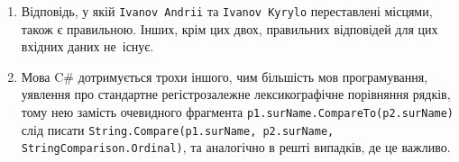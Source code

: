 \Note
\begin{enumerate}
\item
Відповідь, у якій {\tt Ivanov Andrii} та {\tt Ivanov Kyrylo} переставлені місцями, також є правильною. 
Інших, крім цих двох, правильних відповідей для цих вхідних даних не~існує.

\item
Мова C\# дотримується трохи іншого, чим більшість мов програмування, уявлення про стандартне регістрозалежне лексикографічне порівняння рядків, тому нею замість очевидного фрагмента {\tt p1.surName.CompareTo(p2.surName)}
слід писати {\tt String.Compare(p1.surName, p2.surName, StringComparison.Ordinal)},
та аналогічно в решті випадків, де це важливо.
\end{enumerate}